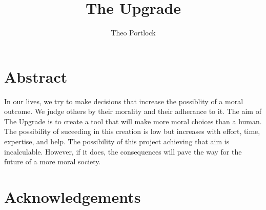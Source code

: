 \documentclass[12pt]{book}
\title{The Upgrade}
\author{Theo Portlock}
\begin{document}
\frontmatter
\maketitle

\chapter{Abstract}
In our lives, we try to make decisions that increase the possiblity of a moral outcome. We judge others by their morality and their adherance to it. The aim of The Upgrade is to create a tool that will make more moral choices than a human. The possibility of suceeding in this creation is low but increases with effort, time, expertise, and help. The possibility of this project achieving that aim is incalculable. However, if it does, the consequences will pave the way for the future of a more moral society.

\cleardoublepage
{}
{}
\tableofcontents

\cleardoublepage
{}
{}
\singlespacing
\glsfindwidesttoplevelname
\printglossary[title={Abbreviations},style=alttree]
\doublespacing

\cleardoublepage
{}
{}
\listoffigures

\cleardoublepage
{}
{}
\listoftables

\mainmatter








\backmatter


\chapter{Acknowledgements}


\end{document}
